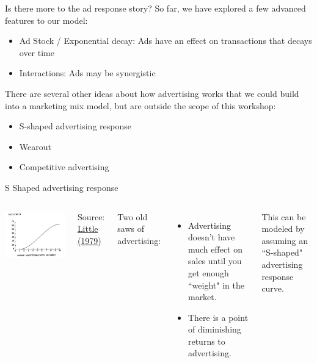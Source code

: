 \documentclass[10pt, aspectratio=169]{beamer}
\newcommand{\source}[1]{\begin{flushright} \footnotesize Source: {#1} \end{flushright} \normalsize}
\begin{document}
\begin{frame}{Is there more to the ad response story?}
So far, we have explored a few advanced features to our model: 
\begin{itemize}
\item \alert{Ad Stock / Exponential decay}: Ads have an effect on transactions that decays over time
\item \alert{Interactions}: Ads may be synergistic
\end{itemize}
\bigskip \pause
There are several other ideas about how advertising works that we could build into a marketing mix model, but are outside the scope of this workshop: 
\begin{itemize}
\item \alert{S-shaped advertising response}
\item \alert{Wearout}
\item \alert{Competitive advertising}
\end{itemize}
\end{frame} 

\begin{frame}{S Shaped advertising response}
\begin{columns}
\includegraphics[width=\textwidth]{images/sshapedadresponse.png}
\source{\href{https://github.com/eleafeit/ad_response_tutorial/blob/master/Papers/Little1979AggregateAdvertisingModels.pdf}{Little (1979)}}
Two old saws of advertising: 
\begin{itemize} 
\item Advertising doesn't have much effect on sales until you get enough ``weight" in the market. 
\item There is a point of \alert{diminishing returns} to advertising. 
\end{itemize}
This can be modeled by assuming an ``S-shaped" advertising response curve. 
\end{columns}
\end{frame}
\end{document}
